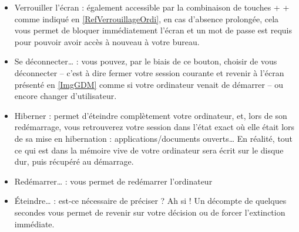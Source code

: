 \begin{itemize}
\item Verrouiller l'écran : également accessible par la combinaison de touches  +  +  comme indiqué en \ref{RefVerrouillageOrdi}, en cas d'absence prolongée, cela vous permet de bloquer immédiatement l'écran et un mot de passe est requis pour pouvoir avoir accès à nouveau à votre bureau.
\item Se déconnecter\ldots{} : vous pouvez, par le biais de ce bouton, choisir de vous déconnecter -- c'est à dire fermer votre session courante et revenir à l'écran présenté en \ref{ImgGDM} comme si votre ordinateur venait de démarrer -- ou encore changer d'utilisateur.
\item Hiberner : permet d'éteindre complètement votre ordinateur, et, lors de son redémarrage, vous retrouverez votre session dans l'état exact où elle était lors de sa mise en hibernation : applications/documents ouverts\ldots{} En réalité, tout ce qui est dans la mémoire vive de votre ordinateur sera écrit sur le disque dur, puis récupéré au démarrage.
\item Redémarrer\ldots{} : vous permet de redémarrer l'ordinateur
\item Éteindre\ldots{} : est-ce nécessaire de préciser ? Ah si ! Un décompte de quelques secondes vous permet de revenir sur votre décision ou de forcer l'extinction immédiate.
\end{itemize}
\SessionIndicator
